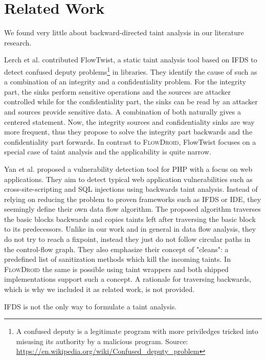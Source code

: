 \documentclass[../draft.tex]{subfiles}
\begin{document}
    \chapter{Related Work}
    We found very little about backward-directed taint analysis in our literature research. 

    Lerch et al.\cite{Lerch2014} contributed FlowTwist, a static taint analysis tool based on IFDS to detect confused deputy problems\footnote{A confused deputy is a legitimate program with more priviledges tricked into misusing its authority by a malicious program. Source: \url{https://en.wikipedia.org/wiki/Confused_deputy_problem}} in libraries. They identify the cause of such as a combination of an integrity and a confidentiality problem. For the integrity part, the sinks perform sensitive operations and the sources are attacker controlled while for the confidentiality part, the sinks can be read by an attacker and sources provide sensitive data. A combination of both naturally gives a centered statement. Now, the integrity sources and confidentiality sinks are way more frequent, thus they propose to solve the integrity part backwards and the confidentiality part forwards. In contrast to \textsc{FlowDroid}, FlowTwist focuses on a special case of taint analysis and the applicability is quite narrow. 

    Yan et al.\cite{Yan2017} proposed a vulnerability detection tool for PHP with a focus on web applications. They aim to detect typical web application vulnerabilities such as cross-site-scripting and SQL injections using backwards taint analysis. 
    Instead of relying on reducing the problem to proven frameworks such as IFDS or IDE, they seemingly define their own data flow algorithm. The proposed algorithm traverses the basic blocks backwards and copies taints left after traversing the basic block to its predecessors. Unlike in our work and in general in data flow analysis, they do not try to reach a fixpoint, instead they just do not follow circular paths in the control-flow graph. 
    They also emphasize their concept of "cleans": a predefined list of sanitization methods which kill the incoming taints. 
    In \textsc{FlowDroid} the same is possible using taint wrappers and both shipped implementations support such a concept.
    A rationale for traversing backwards, which is why we included it as related work, is not provided.

    IFDS is not the only way to formulate a taint analysis.
\end{document}
